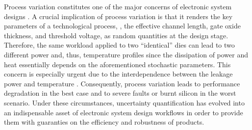 Process variation constitutes one of the major concerns of electronic system designs \cite{chandrakasan2001, srivastava2010}.
A crucial implication of process variation is that it renders the key parameters of a technological process, \eg, the effective channel length, gate oxide thickness, and threshold voltage, as random quantities at the design stage.
Therefore, the same workload applied to two ``identical'' dies can lead to two different power and, thus, temperature profiles since the dissipation of power and heat essentially depends on the aforementioned stochastic parameters.
This concern is especially urgent due to the interdependence between the leakage power and temperature \cite{srivastava2010}.
Consequently, process variation leads to performance degradation in the best case and to severe faults or burnt silicon in the worst scenario.
Under these circumstances, uncertainty quantification \cite{xiu2010, maitre2010} has evolved into an indispensable asset of electronic system design workflows in order to provide them with guaranties on the efficiency and robustness of products.
